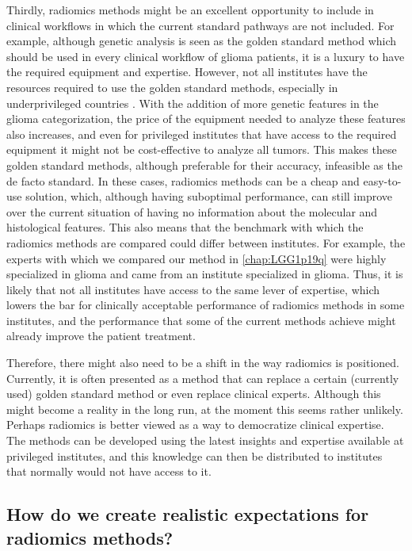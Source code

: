 Thirdly, radiomics methods might be an excellent opportunity to include in clinical workflows in which the current standard pathways are not included.
For example, although genetic analysis is seen as the golden standard method which should be used in every clinical workflow of glioma patients, it is a luxury to have the required equipment and expertise.
However, not all institutes have the resources required to use the golden standard methods, especially in underprivileged countries \autocite{santosh2019india}.
With the addition of more genetic features in the glioma categorization, the price of the equipment needed to analyze these features also increases, and even for privileged institutes that have access to the required equipment it might not be cost-effective to analyze all \glspl{tumor}\autocite{malzkorn2016practical,dewitt2017costIDH}.
This makes these golden standard methods, although preferable for their accuracy, infeasible as the de facto standard.
In these cases, radiomics methods can be a cheap and easy-to-use solution, which, although having suboptimal performance, can still improve over the current situation of having no information about the molecular and histological features.
This also means that the benchmark with which the radiomics methods are compared could differ between institutes.
For example, the experts with which we compared our method in \cref{chap:LGG1p19q} were highly specialized in glioma and came from an institute specialized in glioma.
Thus, it is likely that not all institutes have access to the same lever of expertise, which lowers the bar for clinically acceptable performance of radiomics methods in some institutes, and the performance that some of the current methods achieve might already improve the patient treatment.

Therefore, there might also need to be a shift in the way radiomics is positioned.
Currently, it is often presented as a method that can replace a certain (currently used) golden standard method or even replace clinical experts.
Although this might become a reality in the long run, at the moment this seems rather unlikely.
Perhaps radiomics is better viewed as a way to democratize clinical expertise.
The methods can be developed using the latest insights and expertise available at privileged institutes, and this knowledge can then be distributed to institutes that normally would not have access to it.


\subsection{How do we create realistic expectations for radiomics methods?}


